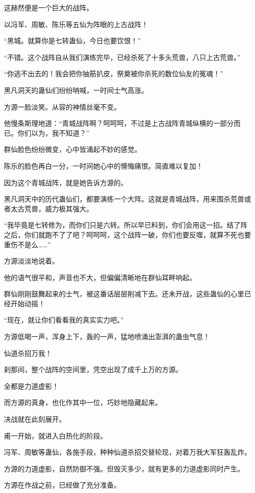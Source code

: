 \begin{this_body}
这赫然便是一个巨大的战阵。

以冯军、周敏、陈乐等五仙为阵眼的上古战阵！

“黑城。就算你是七转蛊仙，今日也要饮恨！”

“不错。这个战阵自从我们演练完毕，已经杀死了十多头荒兽，八只上古荒兽。”

“你逃不出去的！我会把你抽筋扒皮，祭奠被你杀死的数位仙友的冤魂！”

黑凡洞天的蛊仙们纷纷呐喊，一时间士气高涨。

方源一脸淡笑。从容的神情丝毫不变。

他慢条斯理地道：“青城战阵啊？呵呵呵，不过是上古战阵青城纵横的一部分而已。你们以为，我不知道？”

群仙脸色纷纷微变，心中皆涌起不妙的感觉。

陈乐的脸色再白一分，一时间她心中的懊悔痛恨。简直难以复加！

因为这个青城战阵，就是她告诉方源的。

黑凡洞天中的历代蛊仙们，都要演练一个大阵。这就是青城战阵，用来围杀荒兽或者太古荒兽，威力极其强大。

“我毕竟是七转修为，而你们只是六转。所以早已料到，你们会用这一招。结了阵之后，你们就跑不了了吧？呵呵呵，这个战阵一破，你们也要反噬，就算不死也要重伤不是么……”

方源淡淡地说着。

他的语气很平和，声音也不大，但偏偏清晰地在群仙耳畔响起。

群仙刚刚鼓舞起来的士气，被这番话层层削减下去。还未开战，这些蛊仙的心里已经开始动摇！

“现在，就让你们看看我的真实实力吧。”

方源低喝一声，浑身上下，轰的一声，猛地喷涌出澎湃的蛊虫气息！

仙道杀招万我！

刹那间，整个战阵的空间里，凭空出现了成千上万的方源。

全都是力道虚影！

而方源的真身，也化作其中一位，巧妙地隐藏起来。

决战就在此刻展开。

甫一开始，就进入白热化的阶段。

冯军、周敏等蛊仙，各施手段，种种仙道杀招交替轮现，对着万我大军狂轰乱炸。

方源的力道虚影，自然防御不强。但毁灭多少，就有更多的力道虚影同时产生。

方源在作战之前，已经做了充分准备。


\end{this_body}
